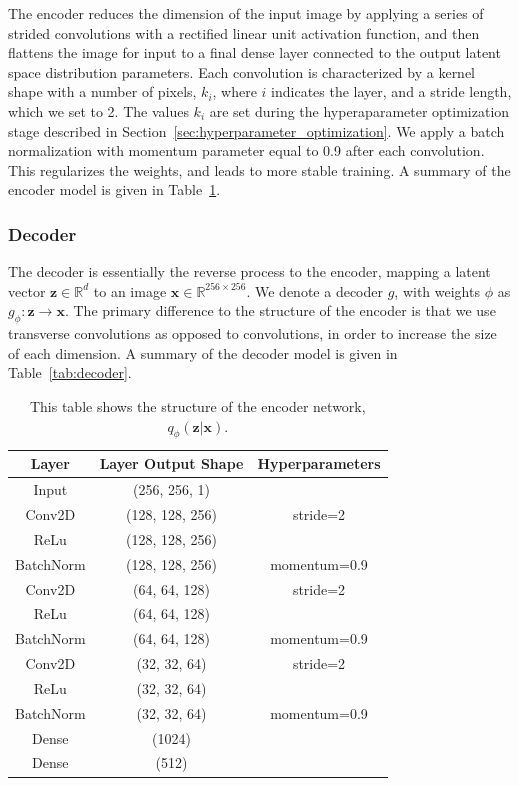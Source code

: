 \documentclass[fleqn,usenatbib]{mnras}
\begin{document}
The encoder reduces the dimension of the input image by applying a series of strided convolutions with a rectified linear unit activation function, and then flattens the image for input to a final dense layer connected to the output latent space distribution parameters. Each convolution is characterized by a kernel shape with a number of pixels, $k_i$, where $i$ indicates the layer, and a stride length, which we set to 2. The values $k_i$ are set during the hyperaparameter optimization stage described in Section~\ref{sec:hyperparameter_optimization}. We apply a batch normalization with momentum parameter equal to 0.9 after each convolution. This regularizes the weights, and leads to more stable training. A summary of the encoder model is given in Table~\ref{tab:encoder}.

\subsubsection{Decoder} The decoder is essentially the reverse process to the encoder, mapping a latent vector $\mathbf z \in \mathbb R^d$ to an image $\mathbf x \in \mathbb{R}^{256\times256}$. We denote a decoder $g$, with weights $\phi$ as $g_\phi: \mathbf z \rightarrow \mathbf x$. The primary difference to the structure of the encoder is that we use transverse convolutions as opposed to convolutions, in order to increase the size of each dimension. A summary of the decoder model is given in Table~\ref{tab:decoder}.

\begin{table}
    \centering
    \begin{tabular}{c|c|c}
        \hline
        Layer & Layer Output Shape & Hyperparameters \\
        \hline
        \hline
        Input & (256, 256, 1) & \\
        Conv2D & (128, 128, 256) & stride=2\\
        ReLu & (128, 128, 256) & \\
        BatchNorm & (128, 128, 256) & momentum=0.9 \\
        Conv2D & (64, 64, 128) & stride=2 \\
        ReLu & (64, 64, 128) & \\
        BatchNorm & (64, 64, 128) & momentum=0.9 \\
        Conv2D & (32, 32, 64) & stride=2 \\
        ReLu & (32, 32, 64) & \\
        BatchNorm & (32, 32, 64) & momentum=0.9 \\
        Dense & (1024) & \\
        Dense & (512) & \\
        \hline
    \end{tabular}
    \caption{This table shows the structure of the encoder network, $q_\phi(\mathbf z | \mathbf x)$.}
    \label{tab:encoder}
\end{table}
\end{document}
